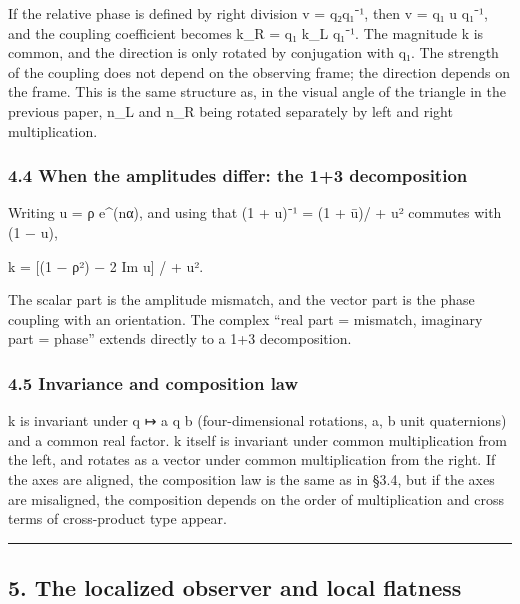 \documentclass[
  a4paper,
]{article}
\begin{document}
If the relative phase is defined by right division v = q₂q₁⁻¹, then v =
q₁ u q₁⁻¹, and the coupling coefficient becomes k\_R = q₁ k\_L q₁⁻¹. The
magnitude \textbar k\textbar{} is common, and the direction is only
rotated by conjugation with q₁. The strength of the coupling does not
depend on the observing frame; the direction depends on the frame. This
is the same structure as, in the visual angle of the triangle in the
previous paper, n\_L and n\_R being rotated separately by left and right
multiplication.

\subsubsection{4.4 When the amplitudes differ: the 1+3
decomposition}\label{when-the-amplitudes-differ-the-13-decomposition}

Writing u = ρ e\^{}(nα), and using that (1 + u)⁻¹ = (1 + ū)/ +
u\textbar² commutes with (1 − u),

k = {[}(1 − ρ²) − 2 Im u{]} /  + u\textbar².

The scalar part is the amplitude mismatch, and the vector part is the
phase coupling with an orientation. The complex ``real part = mismatch,
imaginary part = phase'' extends directly to a 1+3 decomposition.

\subsubsection{4.5 Invariance and composition
law}\label{invariance-and-composition-law}

\textbar k\textbar{} is invariant under q ↦ a q b (four-dimensional
rotations, a, b unit quaternions) and a common real factor. k itself is
invariant under common multiplication from the left, and rotates as a
vector under common multiplication from the right. If the axes are
aligned, the composition law is the same as in §3.4, but if the axes are
misaligned, the composition depends on the order of multiplication and
cross terms of cross-product type appear.

\begin{center}\rule{0.5\linewidth}{0.5pt}\end{center}

\subsection{5. The localized observer and local
flatness}\label{the-localized-observer-and-local-flatness}
\end{document}
